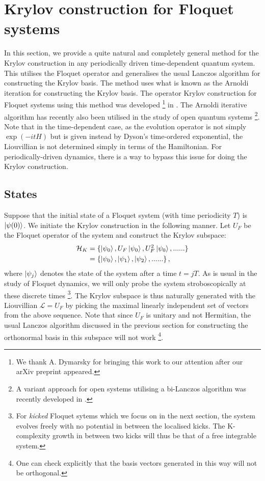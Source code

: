 \documentclass[a4paper,12pt]{article}
\begin{document}
\section{Krylov construction for Floquet systems} \label{KF}

In this section, we provide a quite natural and completely general method for the Krylov construction in any periodically driven time-dependent quantum system. This utilises the Floquet operator and generalises the usual Lanczos algorithm for constructing the Krylov basis. The method uses what is known as the Arnoldi iteration for constructing the Krylov basis. The operator Krylov construction for Floquet systems using this method was developed \footnote{We thank A. Dymarsky for bringing  this work to our attention after our arXiv preprint appeared.} in \cite{Yates:2021asz}. The Arnoldi iterative algorithm has recently \cite{Bhattacharya_2022, Bhattacharjee:2022lzy} also been utilised in the study of open quantum systems \footnote{A variant approach for open systems utilising a bi-Lanczos algorithm was recently developed in \cite{Bhattacharya:2023zqt}.}. Note that in the time-dependent case, as the evolution operator is not simply $\exp (-i t H )$ but is given instead by Dyson's time-ordered exponential, the Liouvillian is not determined simply in terms of the Hamiltonian. For periodically-driven dynamics, there is a way to bypass this issue for doing the Krylov construction.

\subsection{States}

Suppose that the initial state of a Floquet system (with time periodicity $T$) is $\ket{\psi(0)}$. We initiate the Krylov construction in the following manner. Let $U_F$ be the Floquet operator of the system and construct the Krylov subspace:
\begin{align}
\mathcal{H}_K &=\{\ket{\psi_0}, U_F \ket{\psi_0}, U_F^ 2 \ket{\psi_0},......\} \nonumber
\\ &=\{\ket{\psi_0}, \ket{\psi_1}, \ket{\psi_2},......\} \, ,
\end{align}
where $\ket{\psi_j}$ denotes the state of the system after a time $t=jT$. As is usual in the study of Floquet dynamics, we will only probe the system stroboscopically at these discrete times \footnote{For {\it kicked} Floquet sytems which we focus on in the next section,  the system evolves freely with no potential in between the localised kicks. The K-complexity growth in between two kicks will thus be that of a free integrable system.}. The Krylov subspace is thus naturally generated with the Liouvillian $\mathcal{L}=U_F$ by picking the maximal linearly independent set of vectors from the above sequence.
Note that since $U_F$ is unitary and not Hermitian, the usual Lanczos algorithm discussed in the previous section for constructing the orthonormal basis in this subspace will not work \footnote{One can check explicitly that the basis vectors generated in this way will not be orthogonal.}. 
\end{document}
